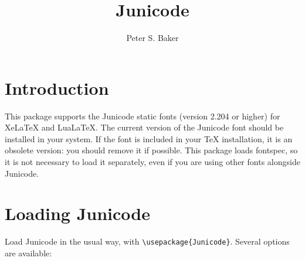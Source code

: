 \documentclass{article}
\title{Junicode}
\author{Peter S. Baker}
\date{}
\begin{document}
\maketitle

\section{Introduction}

This package supports the Junicode static fonts (version 2.204 or higher)
for XeLaTeX and LuaLaTeX. The current version of the Junicode font should
be installed in your system. If the font is included in your TeX installation,
it is an obsolete version: you should remove it if possible. This package loads
fontspec, so it is not necessary to load it separately, even if you are using
other fonts alongside Junicode.

\section{Loading Junicode}

Load Junicode in the usual way, with {\verb|\usepackage{Junicode}|}. Several options are available:
\end{document}
